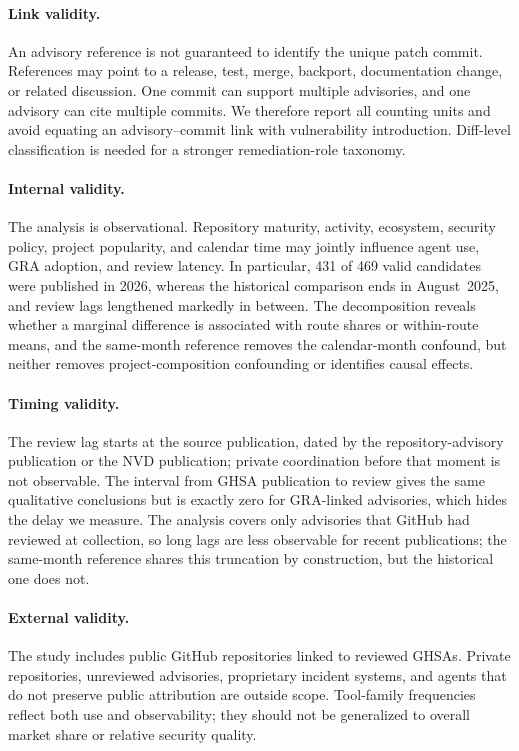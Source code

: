 \documentclass[smallextended,natbib]{svjour3}
\begin{document}
\paragraph{Link validity.}
An advisory reference is not guaranteed to identify the unique patch commit.
References may point to a release, test, merge, backport, documentation change,
or related discussion.  One commit can support multiple advisories, and one
advisory can cite multiple commits.  We therefore report all counting units and
avoid equating an advisory--commit link with vulnerability introduction.
Diff-level classification is needed for a stronger remediation-role taxonomy.

\paragraph{Internal validity.}
The analysis is observational.  Repository maturity, activity, ecosystem,
security policy, project popularity, and calendar time may jointly influence
agent use, GRA adoption, and review latency.  In particular, 431 of 469 valid
candidates were published in 2026, whereas the historical comparison ends in
August~2025, and review lags lengthened markedly in between.  The
decomposition reveals whether a marginal difference is associated with route
shares or within-route means, and the same-month reference removes the
calendar-month confound, but neither removes project-composition confounding or
identifies causal effects.

\paragraph{Timing validity.}
The review lag starts at the source publication, dated by the
repository-advisory publication or the NVD publication; private coordination
before that moment is not observable.  The interval from GHSA publication to
review gives the same qualitative conclusions but is exactly zero for
GRA-linked advisories, which hides the delay we measure.  The analysis covers
only advisories that GitHub had reviewed at collection, so long lags are less
observable for recent publications; the same-month reference shares this
truncation by construction, but the historical one does not. %

\paragraph{External validity.}
The study includes public GitHub repositories linked to reviewed GHSAs.
Private repositories, unreviewed advisories, proprietary incident systems, and
agents that do not preserve public attribution are outside scope.  Tool-family
frequencies reflect both use and observability; they should not be generalized
to overall market share or relative security quality.
\end{document}
